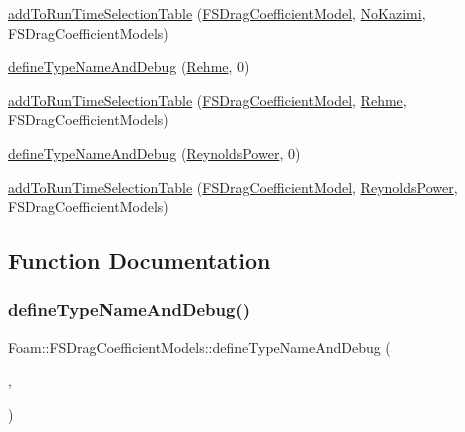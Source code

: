 \begin{DoxyCompactItemize}
\item 
\hyperlink{namespaceFoam_1_1FSDragCoefficientModels_ae9ba9fa0f30f725c48d4c6d561e3cca4}{add\+To\+Run\+Time\+Selection\+Table} (\hyperlink{classFoam_1_1FSDragCoefficientModel}{F\+S\+Drag\+Coefficient\+Model}, \hyperlink{classFoam_1_1FSDragCoefficientModels_1_1NoKazimi}{No\+Kazimi}, F\+S\+Drag\+Coefficient\+Models)
\item 
\hyperlink{namespaceFoam_1_1FSDragCoefficientModels_a6acd28adfac73f8424cfd6fd2094d4d7}{define\+Type\+Name\+And\+Debug} (\hyperlink{classFoam_1_1FSDragCoefficientModels_1_1Rehme}{Rehme}, 0)
\item 
\hyperlink{namespaceFoam_1_1FSDragCoefficientModels_a9c70affb6166120699465646d9d3b293}{add\+To\+Run\+Time\+Selection\+Table} (\hyperlink{classFoam_1_1FSDragCoefficientModel}{F\+S\+Drag\+Coefficient\+Model}, \hyperlink{classFoam_1_1FSDragCoefficientModels_1_1Rehme}{Rehme}, F\+S\+Drag\+Coefficient\+Models)
\item 
\hyperlink{namespaceFoam_1_1FSDragCoefficientModels_a4e3f851819d7a5d22073cf61be09b583}{define\+Type\+Name\+And\+Debug} (\hyperlink{classFoam_1_1FSDragCoefficientModels_1_1ReynoldsPower}{Reynolds\+Power}, 0)
\item 
\hyperlink{namespaceFoam_1_1FSDragCoefficientModels_a3c92ac007efbade3f6e0ade049dd508d}{add\+To\+Run\+Time\+Selection\+Table} (\hyperlink{classFoam_1_1FSDragCoefficientModel}{F\+S\+Drag\+Coefficient\+Model}, \hyperlink{classFoam_1_1FSDragCoefficientModels_1_1ReynoldsPower}{Reynolds\+Power}, F\+S\+Drag\+Coefficient\+Models)
\end{DoxyCompactItemize}


\subsection{Function Documentation}
\mbox{\label{namespaceFoam_1_1FSDragCoefficientModels_a1cf0fe19ae60ba8722d62b6fafe77348}} 
\subsubsection{\texorpdfstring{define\+Type\+Name\+And\+Debug()}{defineTypeNameAndDebug()}\hspace{0.1cm}{\footnotesize\ttfamily [1/7]}}
{\footnotesize\ttfamily Foam\+::\+F\+S\+Drag\+Coefficient\+Models\+::define\+Type\+Name\+And\+Debug (\begin{DoxyParamCaption}\item[{\hyperlink{classFoam_1_1FSDragCoefficientModels_1_1BaxiDalleDonne}{Baxi\+Dalle\+Donne}}]{,  }\item[{0}]{ }\end{DoxyParamCaption})}

